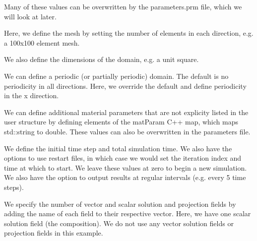Many of these values can be overwritten by the parameters.\-prm file, which we will look at later.


\begin{DoxyCodeInclude}

\end{DoxyCodeInclude}


Here, we define the mesh by setting the number of elements in each direction, e.\-g. a 100x100 element mesh.


\begin{DoxyCodeInclude}

\end{DoxyCodeInclude}


We also define the dimensions of the domain, e.\-g. a unit square.


\begin{DoxyCodeInclude}

\end{DoxyCodeInclude}


We can define a periodic (or partially periodic) domain. The default is no periodicity in all directions. Here, we override the default and define periodicity in the x direction.


\begin{DoxyCodeInclude}

\end{DoxyCodeInclude}


We can define additional material parameters that are not explicity listed in the {\ttfamily user} structure by defining elements of the {\ttfamily mat\-Param} C++ map, which maps {\ttfamily std\-::string} to {\ttfamily double}. These values can also be overwritten in the parameters file.


\begin{DoxyCodeInclude}

\end{DoxyCodeInclude}


We define the initial time step and total simulation time. We also have the options to use restart files, in which case we would set the iteration index and time at which to start. We leave these values at zero to begin a new simulation. We also have the option to output results at regular intervals (e.\-g. every 5 time steps).


\begin{DoxyCodeInclude}

\end{DoxyCodeInclude}


We specify the number of vector and scalar solution and projection fields by adding the name of each field to their respective vector. Here, we have one scalar solution field (the composition). We do not use any vector solution fields or projection fields in this example.


